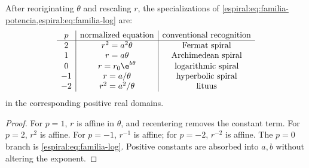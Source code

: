 \begin{theorem}
After reoriginating \(\theta\) and rescaling \(r\), the specializations of
\cref{espiral:eq:familia-potencia,espiral:eq:familia-log} are:
\[
\begin{array}{c|c|c}
p&\text{normalized equation}&\text{conventional recognition}\\ \hline
2&r^2=a^2\theta&\text{Fermat spiral}\\
1&r=a\theta&\text{Archimedean spiral}\\
0&r=r_0\e^{b\theta}&\text{logarithmic spiral}\\
-1&r=a/\theta&\text{hyperbolic spiral}\\
-2&r^2=a^2/\theta&\text{lituus}
\end{array}
\]
in the corresponding positive real domains.
\end{theorem}
\begin{proof}
For \(p=1\), \(r\) is affine in \(\theta\), and recentering removes the
constant term. For \(p=2\), \(r^2\) is affine. For \(p=-1\),
\(r^{-1}\) is affine; for \(p=-2\), \(r^{-2}\) is affine. The \(p=0\) branch
is \cref{espiral:eq:familia-log}. Positive constants are absorbed into \(a,b\)
without altering the exponent.
\end{proof}


